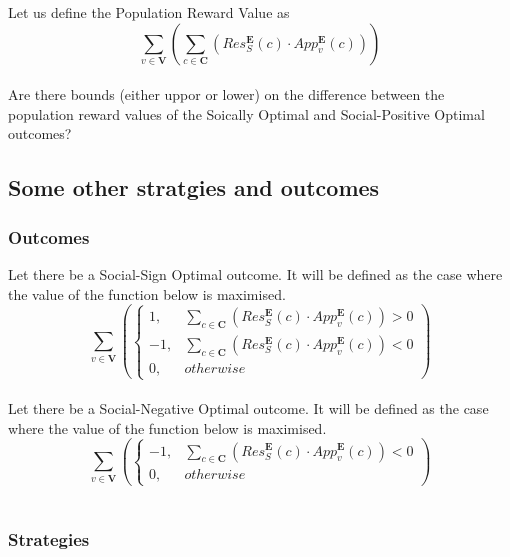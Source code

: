 \documentclass{article}
\begin{document}
Let us define the Population Reward Value as
\begin{equation}
\sum^{}_{v \in \pmb{V}}{\left(
\sum^{}_{c \in \pmb{C}}{\left(
Res^{\pmb{E}}_{S}(c) \cdot App^{\pmb{E}}_{v}(c)
\right)}
\right)}
\end{equation}\\

Are there bounds (either uppor or lower) on the difference between the population reward values of the Soically Optimal and Social-Positive Optimal outcomes?


\subsection{Some other stratgies and outcomes}

\subsubsection{Outcomes}

Let there be a Social-Sign Optimal outcome. It will be defined as the case where the value of the function below is maximised.
\begin{equation}
\sum^{}_{v \in \pmb{V}}{\left(
\begin{cases}
1, & \sum^{}_{c \in \pmb{C}}{(Res^{\pmb{E}}_{S}(c) \cdot App^{\pmb{E}}_{v}(c))} > 0\\
-1, & \sum^{}_{c \in \pmb{C}}{(Res^{\pmb{E}}_{S}(c) \cdot App^{\pmb{E}}_{v}(c))} < 0\\
0, & {otherwise}
\end{cases}
\right)}
\end{equation}\\

Let there be a Social-Negative Optimal outcome. It will be defined as the case where the value of the function below is maximised.
\begin{equation}
\sum^{}_{v \in \pmb{V}}{\left(
\begin{cases}
-1, & \sum^{}_{c \in \pmb{C}}{(Res^{\pmb{E}}_{S}(c) \cdot App^{\pmb{E}}_{v}(c))} < 0\\
0, & {otherwise}
\end{cases}
\right)}
\end{equation}\\

\subsubsection{Strategies}
\end{document}

